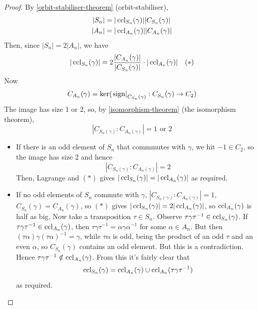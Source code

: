 \documentclass{../../template/note}
\begin{document}
    \begin{proof}
        By \cref{orbit-stabiliser-theorem} (orbit-stabiliser),
        \begin{align*}
            |S_n| &= |\operatorname{ccl}_{S_n}(\gamma)||C_{S_n}(\gamma)| \\
            |A_n| &= |\operatorname{ccl}_{A_n}(\gamma)||C_{A_n}(\gamma)|
        \end{align*}
        Then, since \(|S_n| = 2|A_n|\), we have
        \begin{align*}
            |\operatorname{ccl}_{S_n}(\gamma)| = 2 \frac{|C_{A_n}(\gamma)|}{|C_{S_n}(\gamma)|} \cdot |\operatorname{ccl}_{A_n}(\gamma)| && (*)
        \end{align*}
        Now
        \[
            C_{A_n}(\gamma) = \ker(\left.\operatorname{sign}\right|_{C_{S_n}(\gamma)}: C_{S_n}(\gamma) \to C_2)
        \]
        The image has size 1 or 2, so, by \cref{isomorphism-theorem} (the isomorphism theorem),
        \[
            |C_{S_n(\gamma)} : C_{A_n(\gamma)}| = 1 \text{ or } 2
        \]
        \begin{itemize}
            \item If there is an odd element of \(S_n\) that commmutes with \(\gamma\), we hit \(-1 \in C_2\), so the image has size 2 and hence
            \[
                |C_{S_n(\gamma)} : C_{A_n(\gamma)}| = 2
            \]
            Then, Lagrange and \((*)\) gives \(|\operatorname{ccl}_{S_n}(\gamma)| = |\operatorname{ccl}_{A_n}(\gamma)|\) as required.
            \item If no odd elements of \(S_n\) commute with \(\gamma\), \(|C_{S_n(\gamma)} : C_{A_n(\gamma)}| = 1\), \(C_{S_n}(\gamma) = C_{A_n}(\gamma)\), so \((*)\) gives \(|\operatorname{ccl}_{S_n}(\gamma)| = 2|\operatorname{ccl}_{A_n}(\gamma)|\), so \(\operatorname{ccl}_{A_n}(\gamma)\) is half as big. Now take a transposition \(\tau \in S_n\). Observe \(\tau \gamma \tau^{-1} \in \operatorname{ccl}_{S_n}(\gamma)\). If \(\tau \gamma \tau^{-1} \in \operatorname{ccl}_{A_n}(\gamma)\), then \(\tau \gamma \tau^{-1} = \alpha \gamma \alpha^{-1}\) for some \(\alpha \in A_n\). But then \((\tau \alpha) \gamma (\tau \alpha)^{-1} = \gamma\), while \(\tau \alpha\) is odd, being the product of an odd \(\tau\) and an even \(\alpha\), so \(C_{S_n}(\gamma)\) contains an odd element. But this is a contradiction. Hence \(\tau \gamma \tau^{-1} \notin \operatorname{ccl}_{A_n}(\gamma)\). From this it's fairly clear that 
            \[
                \operatorname{ccl}_{S_n}(\gamma) = \operatorname{ccl}_{A_n}(\gamma) \cup \operatorname{ccl}_{A_n}(\tau \gamma \tau^{-1})
            \]
            as required.
        \end{itemize}
    \end{proof}
    
\end{document}
